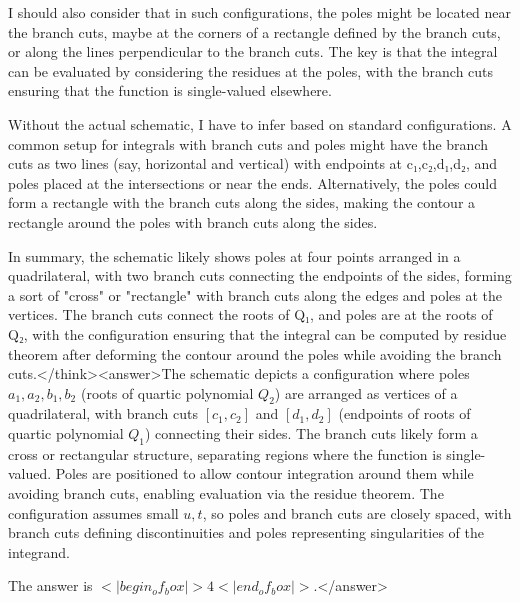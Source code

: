 I should also consider that in such configurations, the poles might be located near the branch cuts, maybe at the corners of a rectangle defined by the branch cuts, or along the lines perpendicular to the branch cuts. The key is that the integral can be evaluated by considering the residues at the poles, with the branch cuts ensuring that the function is single-valued elsewhere.

Without the actual schematic, I have to infer based on standard configurations. A common setup for integrals with branch cuts and poles might have the branch cuts as two lines (say, horizontal and vertical) with endpoints at c₁,c₂,d₁,d₂, and poles placed at the intersections or near the ends. Alternatively, the poles could form a rectangle with the branch cuts along the sides, making the contour a rectangle around the poles with branch cuts along the sides.

In summary, the schematic likely shows poles at four points arranged in a quadrilateral, with two branch cuts connecting the endpoints of the sides, forming a sort of "cross" or "rectangle" with branch cuts along the edges and poles at the vertices. The branch cuts connect the roots of Q₁, and poles are at the roots of Q₂, with the configuration ensuring that the integral can be computed by residue theorem after deforming the contour around the poles while avoiding the branch cuts.</think><answer>The schematic depicts a configuration where poles \(a_1, a_2, b_1, b_2\) (roots of quartic polynomial \(Q_2\)) are arranged as vertices of a quadrilateral, with branch cuts \([c_1, c_2]\) and \([d_1, d_2]\) (endpoints of roots of quartic polynomial \(Q_1\)) connecting their sides. The branch cuts likely form a cross or rectangular structure, separating regions where the function is single-valued. Poles are positioned to allow contour integration around them while avoiding branch cuts, enabling evaluation via the residue theorem. The configuration assumes small \(u, t\), so poles and branch cuts are closely spaced, with branch cuts defining discontinuities and poles representing singularities of the integrand.  

The answer is \(<|begin_of_box|>4<|end_of_box|>\).</answer>